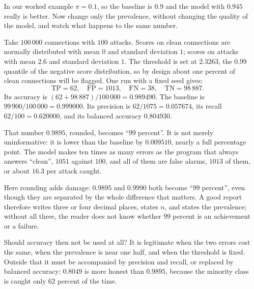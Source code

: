 In our worked example $\pi=0.1$, so the baseline is $0.9$ and the model with $0.945$ really is
better. Now change only the prevalence, without changing the quality of the model, and watch what
happens to the same number.

\begin{contoh}
Take $100\,000$ connections with $100$ attacks. Scores on clean connections are normally
distributed with mean $0$ and standard deviation $1$; scores on attacks with mean $2.6$ and
standard deviation $1$. The threshold is set at $2.3263$, the $0.99$ quantile of the negative score
distribution, so by design about one percent of clean connections will be flagged. One run with a
fixed seed gives:
\[
\mathrm{TP}=62,\quad \mathrm{FP}=1013,\quad \mathrm{FN}=38,\quad \mathrm{TN}=98\,887 .
\]
Its accuracy is $(62+98\,887)/100\,000=0.989490$. The baseline is
$99\,900/100\,000=0.999000$. Its precision is $62/1075=0.057674$, its recall
$62/100=0.620000$, and its balanced accuracy $0.804930$.
\end{contoh}

That number $0.9895$, rounded, becomes ``$99$ percent''. It is not merely uninformative: it is
lower than the baseline by $0.009510$, nearly a full percentage point. The model makes ten times
as many errors as the program that always answers ``clean'', $1051$ against $100$, and all of them
are false alarms, $1013$ of them, or about $16.3$ per attack caught.

Here rounding adds damage: $0.9895$ and $0.9990$ both become ``$99$ percent'', even though they
are separated by the whole difference that matters. A good report therefore writes three or four
decimal places, states $n$, and states the prevalence; without all three, the reader does not know
whether $99$ percent is an achievement or a failure.

Should accuracy then not be used at all? It is legitimate when the two errors cost the same, when
the prevalence is near one half, and when the threshold is fixed. Outside that it must be
accompanied by precision and recall, or replaced by balanced accuracy: $0.8049$ is more honest than
$0.9895$, because the minority class is caught only $62$ percent of the time.

